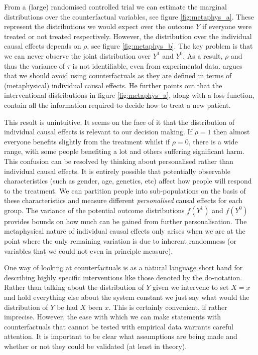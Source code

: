 \documentclass[11pt,a4paper,oneside]{book}
\newcommand{\cf}[2]{{#1}^{#2}}
\theoremstyle{plain}
\theoremstyle{definition}
\begin{document}
From a (large) randomised controlled trial we can estimate the marginal distributions over the counterfactual variables, see figure \ref{fig:metaphys_a}. These represent the distributions we would expect over the outcome $Y$ if everyone were treated or not treated respectively. However, the distribution over the individual causal effects depends on $\rho$, see figure \ref{fig:metaphys_b}. The key problem is that we can never observe the joint distribution over $\cf{Y}{1}$ and $\cf{Y}{0}$. As a result, $\rho$ and thus the variance of $\tau$ is not identifiable, even from experimental data. \citet{Dawid2000} argues that we should avoid using counterfactuals as they are defined in terms of (metaphysical) individual causal effects. He further points out that the interventional distributions in figure \ref{fig:metaphys_a}, along with a loss function, contain all the information required to decide how to treat a new patient.  

This result is unintuitive. It seems on the face of it that the distribution of individual causal effects is relevant to our decision making. If $\rho = 1$ then almost everyone benefits slightly from the treatment whilst if $\rho=0$, there is a wide range, with some people benefiting a lot and others suffering significant harm. This confusion can be resolved by thinking about personalised rather than individual causal effects. It is entirely possible that potentially observable characteristics (such as gender, age, genetics, etc) affect how people will respond to the treatment. We can partition people into sub-populations on the basis of these characteristics and measure different \emph{personalised} causal effects for each group. The variance of the potential outcome distributions $f(\cf{Y}{1})$ and $f(\cf{Y}{0})$ provides bounds on how much can be gained from further personalisation. The metaphysical nature of individual causal effects only arises when we are at the point where the only remaining variation is due to inherent randomness (or variables that we could not even in principle measure). 

One way of looking at counterfactuals is as a natural language short hand for describing highly specific interventions like those denoted by the do-notation. Rather than talking about the distribution of $Y$ given we intervene to set $X=x$ and hold everything else about the system constant we just say what would the distribution of $Y$ be had $X$ been $x$. This is certainly convenient, if rather imprecise. However, the ease with which we can make statements with counterfactuals that cannot be tested with empirical data warrants careful attention. It is important to be clear what assumptions are being made and whether or not they could be validated (at least in theory). 
\end{document}
